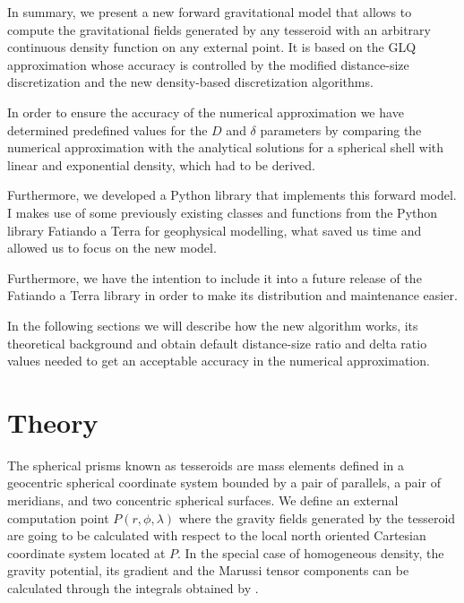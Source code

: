 \documentclass[extra]{gji}
\begin{document}
In summary, we present a new forward gravitational model that allows to 
compute the gravitational fields generated by any tesseroid with an 
arbitrary continuous density function on any external point.
It is based on the GLQ approximation whose accuracy is controlled by 
the modified distance-size discretization \citep{Uieda2016} 
and the new density-based discretization algorithms.

In order to ensure the accuracy of the numerical approximation we have 
determined predefined values for the $D$ and $\delta$ parameters by 
comparing the numerical approximation with the analytical solutions for 
a spherical shell with linear and exponential density, which had to be 
derived.

Furthermore, we developed a Python library that implements this forward 
model.
I makes use of some previously existing classes and functions 
from the Python library Fatiando a Terra for geophysical modelling, 
what saved us time and allowed us to focus on the new model.

Furthermore, we have the intention to include it into a future release 
of the Fatiando a Terra library in order to make its distribution and 
maintenance easier.

In the following sections we will describe how the new algorithm works, its 
theoretical background and obtain default distance-size ratio and delta ratio 
values needed to get an acceptable accuracy in the numerical approximation.


\section{Theory}

The spherical prisms known as tesseroids are mass elements defined in a geocentric spherical coordinate system bounded by a pair of parallels, a pair of  meridians, and two concentric spherical surfaces.
We define an external computation point $P(r, \phi, \lambda)$ where the gravity fields generated by the tesseroid are going to be calculated with respect to the local north oriented Cartesian coordinate system located at $P$.
In the special case of homogeneous density, the gravity potential, its gradient and the Marussi tensor components can be calculated through the integrals obtained by \citet{Grombein2013} \citep[for same notation as the one we will use, see][]{Uieda2016}.
\end{document}
